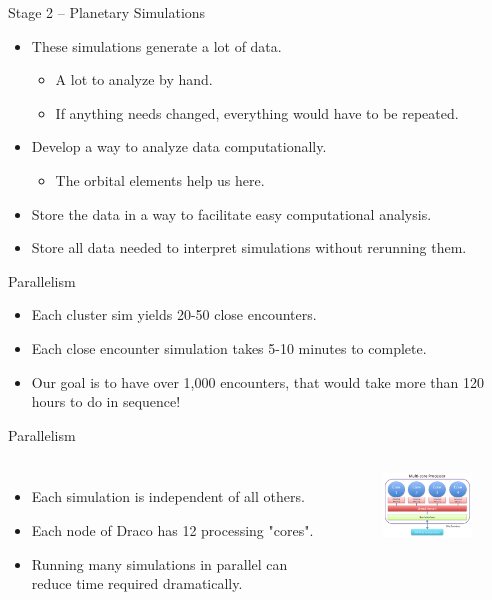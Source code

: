 \documentclass{beamer}
\begin{document}
\begin{frame}{Stage 2 -- Planetary Simulations}
    \begin{itemize}
        \item These simulations generate a lot of data.
            \begin{itemize}
                \item A lot to analyze by hand.
                \item If anything needs changed, everything would have to be
                    repeated.
            \end{itemize}
        \item Develop a way to analyze data computationally.
            \begin{itemize}
                \item The orbital elements help us here.
            \end{itemize}
        \item Store the data in a way to facilitate easy computational
            analysis.
        \item Store all data needed to interpret simulations without rerunning them.
    \end{itemize}
\end{frame}

\begin{frame}{Parallelism}
    \begin{itemize}
        \item Each cluster sim yields 20-50 close encounters.
        \item Each close encounter simulation takes 5-10 minutes to
            complete.
        \item Our goal is to have over 1,000 encounters, that would take
            more than 120 hours to do in sequence!
    \end{itemize}
\end{frame}

\begin{frame}{Parallelism}
    \begin{columns}
        \begin{itemize}
            \item Each simulation is independent of all others.
            \item Each node of Draco has 12 processing "cores".
            \item Running many simulations in parallel can reduce
                time required dramatically.
        \end{itemize}
        \begin{figure}
            \centering
            \includegraphics[width=1.5in]{multicore}
        \end{figure}
    \end{columns}
\end{frame}
\end{document}
